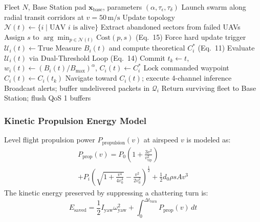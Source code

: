 \documentclass[conference]{IEEEtran}
\begin{document}
\begin{algorithm}[t]
\caption{Autonomous Swarm Search and Failover Execution}
\label{alg:swarm_sar}
\begin{algorithmic}[1]
\REQUIRE Fleet $N$, Base Station pad $\mathbf{x}_{\text{base}}$, parameters $(\alpha, \tau_\epsilon, \tau_\delta)$
\STATE Launch swarm along radial transit corridors at $v = 50\,\text{m/s}$
    \STATE Update topology $\mathcal{N}(t) \leftarrow \{i \mid \text{UAV } i \text{ is alive}\}$
        \STATE Extract abandoned sectors from failed UAVs
            \STATE Assign $s$ to $\arg\min_{p \in \mathcal{N}(t)} \text{Cost}(p, s)$ (Eq.~15)
        \ENDFOR
        \STATE Force hard update trigger $\mathcal{U}_i(t) \leftarrow \text{True}$
    \ENDIF
        \STATE Measure $B_i(t)$ and compute theoretical $C_i^*$ (Eq.~11)
        \STATE Evaluate $\mathcal{U}_i(t)$ via Dual-Threshold Loop (Eq.~14)
            \STATE Commit $t_k \leftarrow t$, $w_i(t) \leftarrow (B_i(t)/B_{\text{max}})^\alpha$, $C_i(t) \leftarrow C_i^*$
        \ELSE
            \STATE Lock commanded waypoint $C_i(t) \leftarrow C_i(t_k)$
        \ENDIF
        \STATE Navigate toward $C_i(t)$; execute 4-channel inference
        \STATE Broadcast alerts; buffer undelivered packets in $\mathcal{Q}_i$
    \ENDFOR
\ENDFOR
\STATE Return surviving fleet to Base Station; flush QoS 1 buffers
\end{algorithmic}
\end{algorithm}

\subsubsection{Kinetic Propulsion Energy Model}
Level flight propulsion power $P_{\text{propulsion}}(v)$ at airspeed $v$ is modeled as:
\begin{multline}
    P_{\text{prop}}(v) = P_0 \left(1 + \frac{3 v^2}{v_{\text{tip}}^2}\right) \\
    + P_i \left( \sqrt{1 + \frac{v^4}{4 v_0^4}} - \frac{v^2}{2 v_0^2} \right)^{\frac{1}{2}} + \frac{1}{2} d_0 \rho s A v^3
\end{multline}
The kinetic energy preserved by suppressing a chattering turn is:
\begin{equation}
    E_{\text{saved}} = \frac{1}{2} I_{\text{yaw}} \omega_{\text{yaw}}^2 + \int_0^{\Delta t_{\text{turn}}} P_{\text{prop}}(v) \, dt
\end{equation}
\end{document}
